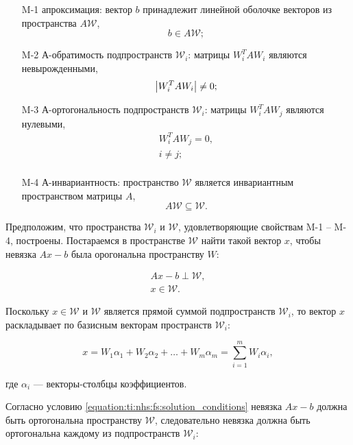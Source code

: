 \begin{itemize}

	\item [M-1] апроксимация: вектор $b$ принадлежит линейной оболочке векторов из пространства $A \mathcal W$,
		$$
			b \in A \mathcal W;
		$$

	\item [M-2] А-обратимость подпространств $\mathcal W_i$: матрицы $W_i^T A W_i$ являются невырожденными,
		$$
			\left | W_i^T A W_i \right | \neq 0;
		$$

	\item [M-3] А-ортогональность подпространств $\mathcal W_i$: матрицы $W_i^T A W_j$ являются нулевыми,
		$$
			\begin{array}{c}
				W_i^T A W_j = 0, \\
				i \neq j; \\
			\end{array}
		$$

	\item [M-4] А-инвариантность: пространство $\mathcal W$ является инвариантным пространством матрицы $A$,
		$$
			A \mathcal W \subseteq \mathcal W.
		$$
\end{itemize}

Предположим, что пространства $\mathcal W_i$ и $\mathcal W$, удовлетворяющие свойствам M-1 -- M-4, построены. Постараемся в
пространстве $\mathcal W$ найти такой вектор $x$, чтобы невязка $Ax - b$ была орогональна пространству $W$:

\begin{equation} \label{equation:ti:nhs:fs:solution_conditions}
	\begin{array}{c}
	Ax - b \perp \mathcal W, \\
	x \in \mathcal W.
	\end{array}
\end{equation}

Поскольку $x \in \mathcal W$ и $\mathcal W$ является прямой суммой подпространств $\mathcal W_i$, то вектор $x$ раскладывает
по базисным векторам пространств $\mathcal W_i$:

\begin{equation} \label{equation:ti:nhs:fs:solution_representation}
	x = W_1 \alpha_1 + W_2 \alpha_2 + \dots + W_m \alpha_m = \sum_{i=1}^m W_i \alpha_i,
\end{equation}

где $\alpha_i$ --- векторы-столбцы коэффициентов.

Согласно условию \ref{equation:ti:nhs:fs:solution_conditions} невязка $Ax - b$ должна быть ортогональна пространству $\mathcal W$, следовательно
невязка должна быть ортогональна каждому из подпространств $\mathcal W_i$:

